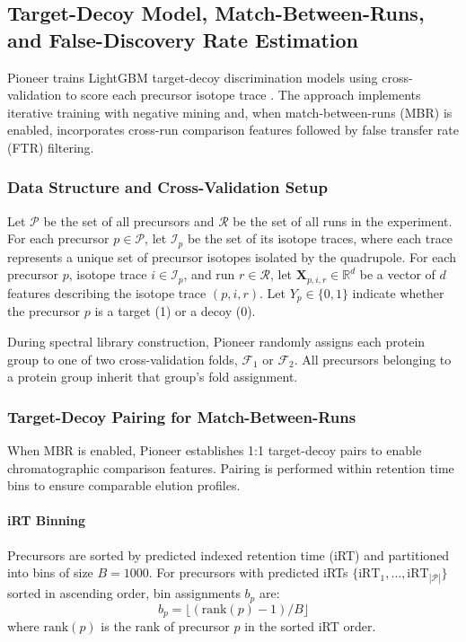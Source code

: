 \documentclass[pdflatex,sn-nature]{sn-jnl}
\begin{document}
\subsection{Target-Decoy Model, Match-Between-Runs, and False-Discovery Rate Estimation}\label{subsec2}

Pioneer trains LightGBM target-decoy discrimination models using cross-validation to score each precursor isotope trace \cite{LightGBM paper...}. The approach implements iterative training with negative mining and, when match-between-runs (MBR) is enabled, incorporates cross-run comparison features followed by false transfer rate (FTR) filtering.

\subsubsection{Data Structure and Cross-Validation Setup}

Let $\mathcal{P}$ be the set of all precursors and $\mathcal{R}$ be the set of all runs in the experiment. For each precursor $p \in \mathcal{P}$, let $\mathcal{I}_p$ be the set of its isotope traces, where each trace represents a unique set of precursor isotopes isolated by the quadrupole. For each precursor $p$, isotope trace $i \in \mathcal{I}_p$, and run $r \in \mathcal{R}$, let $\mathbf{X}_{p,i,r} \in \mathbb{R}^d$ be a vector of $d$ features describing the isotope trace $(p,i,r)$. Let $Y_p \in \{0,1\}$ indicate whether the precursor $p$ is a target (1) or a decoy (0).

During spectral library construction, Pioneer randomly assigns each protein group to one of two cross-validation folds, $\mathcal{F}_1$ or $\mathcal{F}_2$. All precursors belonging to a protein group inherit that group's fold assignment.

\subsubsection{Target-Decoy Pairing for Match-Between-Runs}

When MBR is enabled, Pioneer establishes 1:1 target-decoy pairs to enable chromatographic comparison features. Pairing is performed within retention time bins to ensure comparable elution profiles.

\paragraph{iRT Binning} Precursors are sorted by predicted indexed retention time (iRT) and partitioned into bins of size $B = 1000$. For precursors with predicted iRTs $\{\text{iRT}_1, \ldots, \text{iRT}_{|\mathcal{P}|}\}$ sorted in ascending order, bin assignments $b_p$ are:
\begin{equation}
  b_p = \lfloor (\text{rank}(p) - 1) / B \rfloor
\end{equation}
where $\text{rank}(p)$ is the rank of precursor $p$ in the sorted iRT order.
\end{document}
